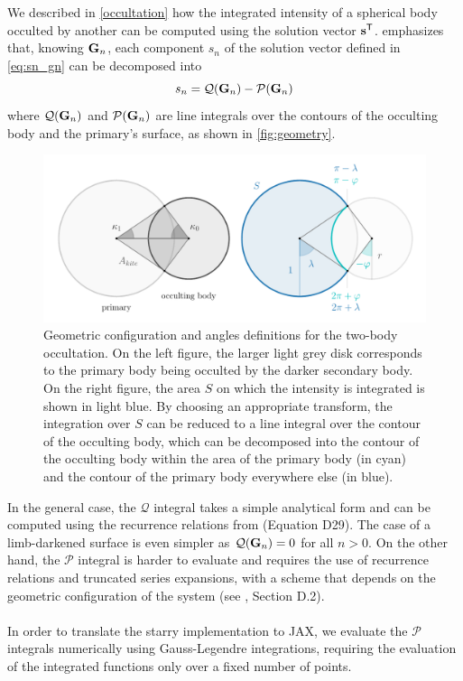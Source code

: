 \documentclass[modern]{aastex631}
\begin{document}
We described in \autoref{occultation} how the integrated intensity of a spherical body occulted by another can be computed using the solution vector ${\mathbf{s}}^\mathsf{T}$. \cite{pal2012} emphasizes that, knowing ${\mathbf{G}}_n$, each component $s_n$ of the solution vector defined in \autoref{eq:sn_gn} can be decomposed into
\begin{equation}
    s_n = \mathcal{Q}(\bvec{G}_n) - \mathcal{P}(\bvec{G}_n)
\end{equation}
where $\mathcal{Q}({\mathbf{G}}_n)$ and $\mathcal{P}({\mathbf{G}}_n)$ are line integrals over the contours of the occulting body and the primary's surface, as shown in \autoref{fig:geometry}.
%
\begin{figure}[H]
    \begin{center}
        \includegraphics[width=\textwidth]{../workflows/geometry/figures/occultation_geometry.pdf}
        \caption{Geometric configuration and angles definitions for the two-body occultation. On the left figure, the larger light grey disk corresponds to the primary body being occulted by the darker secondary body. On the right figure, the area $S$ on which the intensity is integrated is shown in light blue. By choosing an appropriate transform, the integration over $S$ can be reduced to a line integral over the contour of the occulting body, which can be decomposed into the contour of the occulting body within the area of the primary body (in cyan) and the contour of the primary body everywhere else (in blue).}
        \label{fig:geometry}
    \end{center}
\end{figure}
%
In the general case, the $\mathcal{Q}$ integral takes a simple analytical form and can be computed using the recurrence relations from \cite{starry} (Equation D29). The case of a limb-darkened surface is even simpler as $\mathcal{Q}({\mathbf{G}}_n) = 0$ for all $n > 0$. On the other hand, the $\mathcal{P}$ integral is harder to evaluate and requires the use of recurrence relations and truncated series expansions, with a scheme that depends on the geometric configuration of the system (see \citealt{starry}, Section D.2).\\\\
In order to translate the \textsf{starry}  implementation to \textsf{JAX}, we evaluate the $\mathcal{P}$ integrals numerically using Gauss-Legendre integrations, requiring the evaluation of the integrated functions only over a fixed number of points.\\\\
\end{document}
